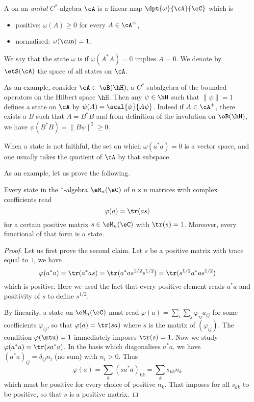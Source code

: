 \begin{definition}      \label{DefStateUnital}
	A  on an \emph{unital} $C^*$-algebra $\cA$ is a linear map $\dpt{\omega}{\cA}{\eC}$ which is

	\begin{itemize}
		\item positive: $\omega(A)\geq 0$ for every $A\in\cA^+$,
		\item normalised: $\omega(\cun)=1$.
	\end{itemize}
	We say that the state $\omega$ is  if $\omega(A^*A)=0$ implies $A=0$. We denote by $\etS(\cA)$ the space of all states on $\cA$.
\end{definition}
As an example, consider $\cA\subset\oB(\hH)$, a $C^*$-subalgebra of the bounded operators on the Hilbert space $\hH$. Then any $\psi\in\hH$ such that $\| \psi \|=1$ defines a state on $\cA$ by $\psi(A)=\scal{\psi}{A\psi}$. Indeed if $A\in\cA^+$, there exists a $B$ such that $A=B^*B$ and from definition of the involution on $\oB(\hH)$, we have $\psi(B^*B)=\| B\psi \|^2\geq 0$.

When a state is not faithful, the set on which $\omega(a^*a)=0$ is a vector space, and one usually takes the quotient of $\cA$ by that subspace.

As an example, let us prove the following.
\begin{proposition}                 \label{Propstaretattraces}
	Every state in the $*$-algebra $\eM_n(\eC)$ of $n\times n$ matrices with complex coefficients read
	\begin{equation}
		\varphi(a)=\tr(as)
	\end{equation}
	for a certain positive matrix $s\in\eM_{n}(\eC)$ with $\tr(s)=1$. Moreover, every functional of that form is a state.
\end{proposition}

\begin{proof}
	Let us first prove the second claim. Let $s$ be a positive matrix with trace equal to $1$, we have
	\[
		\varphi(a^*a)=\tr(a^*as)=\tr(a^*as^{1/2}s^{1/2})=\tr(s^{1/2}a^*as^{1/2})
	\]
	which is positive. Here we used the fact that every positive element reads $a^*a$ and positivity of $s$ to define $s^{1/2}$.

	By linearity, a state on $\eM_n(\eC)$ must read $\varphi(a)=\sum_i\sum_j\varphi_{ij}a_{ij}$ for some coefficients $\varphi_{ij}$, so that $\varphi(a)=\tr(sa)$ where $s$ is the matrix of $(\varphi_{ij})$. The condition $\varphi(\mtu)=1$ immediately imposes $\tr(s)=1$. Now we study $\varphi(a^*a)=\tr(sa^*a)$. In the basis which diagonalises $a^*a$, we have $(a^*a)_{ij}=\delta_{ij}n_i$ (no sum) with $n_i>0$.  Thus
	\[
		\varphi(a)=\sum_k(sa^*a)_{kk}=\sum_ks_{kk}n_k
	\]
	which must be positive for every choice of positive $n_k$. That imposes for all $s_{kk}$ to be positive, so that $s$ is a positive matrix.
\end{proof}

